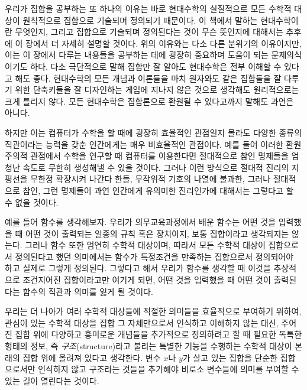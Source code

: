 \documentclass{../../large}
\begin{document}
우리가 집합을 공부하는 또 하나의 이유는 바로 현대수학의 실질적으로 모든 수학적 대상이 원칙적으로 집합으로 기술되며 정의되기 때문이다.
이 책에서 말하는 현대수학이란 무엇인지, 그리고 집합으로 기술되며 정의된다는 것이 무슨 뜻인지에 대해서는 추후에 이 장에서 더 자세히 설명할 것이다.
위의 이유와는 다소 다른 분위기의 이유이지만, 이는 이 장에서 다루는 내용들을 공부하는 데에 굉장히 중요하며 도움이 되는 문제의식이기도 하다.
다소 극단적으로 말해 집합만 잘 알아도 현대수학은 전부 이해할 수 있다고 해도 좋다.
현대수학의 모든 개념과 이론들을 마치 원자와도 같은 집합들을 잘 다루기 위한 단축키들을 잘 디자인하는 게임에 지나지 않은 것으로 생각해도 원리적으로는 크게 틀리지 않다.
모든 현대수학은 집합론으로 환원될 수 있다고까지 말해도 과언은 아니다.

하지만 이는 컴퓨터가 수학을 할 때에 굉장히 효율적인 관점일지 몰라도 다양한 종류의 직관이라는 능력을 갖춘 인간에게는 매우 비효율적인 관점이다.
예를 들어 이러한 환원주의적 관점에서 수학을 연구할 때 컴퓨터를 이용한다면 절대적으로 참인 명제들을 엄청난 속도로 무한히 생성해낼 수 있을 것이다.
그러나 이런 방식으로 절대적 진리의 지평선을 무한정 확장시켜 나간다 한들, 무작위적 기호의 나열에 불과한, 그러나 절대적으로 참인, 그런 명제들이 과연 인간에게 유의미한 진리인가에 대해서는 그렇다고 할 수 없을 것이다.

예를 들어 함수를 생각해보자.
우리가 의무교육과정에서 배운 함수는 어떤 것을 입력했을 때 어떤 것이 출력되는 일종의 규칙 혹은 장치이지, 보통 집합이라고 생각되지는 않는다.
그러나 함수 또한 엄연히 수학적 대상이며, 따라서 모든 수학적 대상이 집합으로서 정의된다고 했던 의미에서는 함수가 특정조건을 만족하는 집합으로서 정의되어야 하고 실제로 그렇게 정의된다.
그렇다고 해서 우리가 함수를 생각할 때 이것을 추상적으로 조건지어진 집합이라고만 여기게 되면, 어떤 것을 입력했을 때 어떤 것이 출력된다는 함수의 직관과 의미를 잃게 될 것이다.

우리는 더 나아가 여러 수학적 대상들에 적절한 의미들을 효율적으로 부여하기 위하여, 관심이 있는 수학적 대상을 집합 그 자체만으로서 인식하고 이해하지 않는 대신, 주어진 집합 위에 다양하고 흥미로운 개념들을 추가적으로 정의하려고 할 때 필요한 독특한 형태의 정보, 즉 \emph{구조}(structure)라고 불리는 특별한 기능을 수행하는 수학적 대상이 본래의 집합 위에 올려져 있다고 생각한다.
변수 $x$나 $y$가 살고 있는 집합을 단순한 집합으로서만 인식하지 않고 구조라는 것들을 추가해야 비로소 변수들에 의미를 부여할 수 있는 길이 열린다는 것이다.
\end{document}
